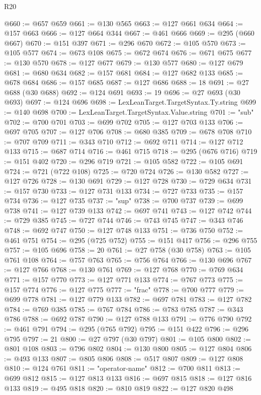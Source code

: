 \begin{lexlean}{R20}
\begin{coremodule}
{{{{{{{{{{{{{{{{{{{{{{{{{{{{{{{{{{{{{{{{{{{{{{{{{{{{{{{{{{{{{{{@660 := @657 @659
@661 := @130 @565
@663 := @127 @661 @634
@664 := @157 @663
@666 := @127 @664 @344
@667 := @461 @666
@669 := @295 (@660 @667)
@670 := @151 @397
@671 := @296 @670
@672 := @105 @570
@673 := @105 @577
@674 := @673 @108
@675 := @672 @674
@676 := @671 @675
@677 := @130 @570
@678 := @127 @677
@679 := @130 @577
@680 := @127 @679
@681 := @680 @634
@682 := @157 @681
@684 := @127 @682 @133
@685 := @678 @684
@686 := @157 @685
@687 := @127 @686
@688 := 18
@691 := @27 @688 (@30 @688)
@692 := @124 @691
@693 := 19
@696 := @27 @693 (@30 @693)
@697 := @124 @696
@698 := LexLeanTarget.TargetSyntax.Ty.string
@699 := @140 @698
@700 := LexLeanTarget.TargetSyntax.Value.string
@701 := "sub"
@702 := @700 @701
@703 := @699 @702
@705 := @127 @703 @133
@706 := @697 @705
@707 := @127 @706
@708 := @680 @385
@709 := @678 @708
@710 := @707 @709
@711 := @343 @710
@712 := @692 @711
@714 := @127 @712 @133
@715 := @687 @714
@716 := @461 @715
@718 := @295 (@676 @716)
@719 := @151 @402
@720 := @296 @719
@721 := @105 @582
@722 := @105 @691
@724 := @721 (@722 @108)
@725 := @720 @724
@726 := @130 @582
@727 := @127 @726
@728 := @130 @691
@729 := @127 @728
@730 := @729 @634
@731 := @157 @730
@733 := @127 @731 @133
@734 := @727 @733
@735 := @157 @734
@736 := @127 @735
@737 := "sup"
@738 := @700 @737
@739 := @699 @738
@741 := @127 @739 @133
@742 := @697 @741
@743 := @127 @742
@744 := @729 @385
@745 := @727 @744
@746 := @743 @745
@747 := @343 @746
@748 := @692 @747
@750 := @127 @748 @133
@751 := @736 @750
@752 := @461 @751
@754 := @295 (@725 @752)
@755 := @151 @417
@756 := @296 @755
@757 := @105 @696
@758 := 20
@761 := @27 @758 (@30 @758)
@763 := @105 @761 @108
@764 := @757 @763
@765 := @756 @764
@766 := @130 @696
@767 := @127 @766
@768 := @130 @761
@769 := @127 @768
@770 := @769 @634
@771 := @157 @770
@773 := @127 @771 @133
@774 := @767 @773
@775 := @157 @774
@776 := @127 @775
@777 := "frac"
@778 := @700 @777
@779 := @699 @778
@781 := @127 @779 @133
@782 := @697 @781
@783 := @127 @782
@784 := @769 @385
@785 := @767 @784
@786 := @783 @785
@787 := @343 @786
@788 := @692 @787
@790 := @127 @788 @133
@791 := @776 @790
@792 := @461 @791
@794 := @295 (@765 @792)
@795 := @151 @422
@796 := @296 @795
@797 := 21
@800 := @27 @797 (@30 @797)
@801 := @105 @800
@802 := @801 @108
@803 := @796 @802
@804 := @130 @800
@805 := @127 @804
@806 := @493 @133
@807 := @805 @806
@808 := @517 @807
@809 := @127 @808
@810 := @124 @761
@811 := "operator-name"
@812 := @700 @811
@813 := @699 @812
@815 := @127 @813 @133
@816 := @697 @815
@818 := @127 @816 @133
@819 := @495 @818
@820 := @810 @819
@822 := @127 @820 @498
}}}}}}}}}}}}}}}}}}}}}}}}}}}}}}}}}}}}}}}}}}}}}}}}}}}}}}}}}}}}}}}
\end{coremodule}
\end{lexlean}
